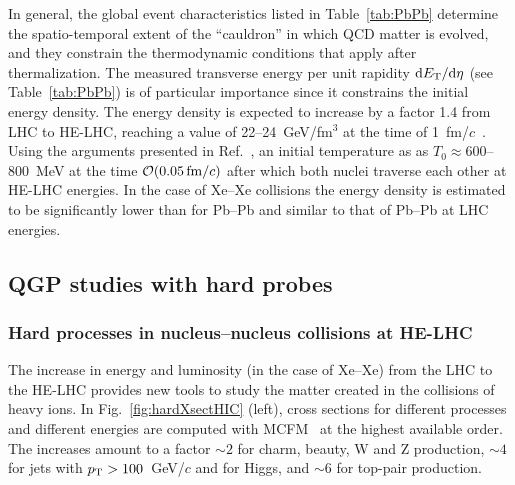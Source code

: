 \documentclass[../report.tex]{subfiles}
\begin{document}
In general, the global event characteristics listed in Table~\ref{tab:PbPb} determine the spatio-temporal extent of the ``cauldron'' in which QCD matter is evolved, and they
constrain the thermodynamic conditions that apply after thermalization. The measured transverse energy per unit rapidity ${\rm d}E_{\rm T}/{\rm d}\eta$ (see Table~\ref{tab:PbPb})
is of particular importance since it constrains the initial energy density. 
The energy density is expected to increase by a factor 1.4 from LHC to HE-LHC, reaching a value of 22--24~GeV/fm$^3$ at the time of 1~fm/$c$~\cite{Dainese:2016gch}. 
Using the arguments presented in Ref.~\cite{Dainese:2016gch}, an initial temperature as 
as $T_0\approx 600$--$800$~MeV at the time $\mathcal{O}(0.05\, {\rm fm}/c)$ after which both nuclei traverse each other at HE-LHC energies.
In the case of Xe--Xe collisions the energy density is estimated to be significantly lower than for Pb--Pb and similar to that of Pb--Pb at LHC energies.


\subsection{QGP studies with hard probes}
\label{sec:HE_hardprobes}


\subsubsection{Hard processes in nucleus--nucleus collisions at HE-LHC}
\label{sec:HE_xsections}

The increase in energy and luminosity (in the case of Xe--Xe) from the LHC to the HE-LHC provides new tools to study the matter created in the collisions of heavy ions.
In Fig.~\ref{fig:hardXsectHIC} (left), cross sections for different processes
and different energies are computed with  MCFM~\cite{Campbell:2010ff}
at the highest available order. The increases amount to a factor
$\sim 2$ for charm, beauty, W and Z production, $\sim 4$ for jets with $p\sb{\scriptstyle\mathrm{T}}>100$~GeV/$c$ and for Higgs, and $\sim 6$ for top-pair production. 
\end{document}
